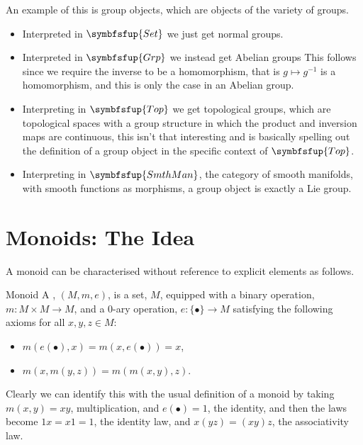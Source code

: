 \documentclass[fleqn]{NotesClass}
\makeatletter
\newcommand{\c@egory}[1]{\symbfsfup{#1}}
\newcommand{\Set}{\c@egory{Set}}
\newcommand{\Grp}{\c@egory{Grp}}
\newcommand{\Top}{\c@egory{Top}}
\makeatother
\begin{document}
    An example of this is group objects, which are objects of the variety of groups.
    \begin{itemize}
        \item Interpreted in \(\Set\) we just get normal groups.
        \item Interpreted in \(\Grp\) we instead get Abelian groups
        This follows since we require the inverse to be a homomorphism, that is \(g \mapsto g^{-1}\) is a homomorphism, and this is only the case in an Abelian group.
        \item Interpreting in \(\Top\) we get topological groups, which are topological spaces with a group structure in which the product and inversion maps are continuous, this isn't that interesting and is basically spelling out the definition of a group object in the specific context of \(\Top\).
        \item Interpreting in \(\makeatletter\c@egory{SmthMan}\makeatother\), the category of smooth manifolds, with smooth functions as morphisms, a group object is exactly a Lie group.
    \end{itemize}
    
    \section{Monoids: The Idea}
    A monoid can be characterised without reference to explicit elements as follows.
    \begin{dfn}{Monoid}{}
        A , \((M, m, e)\), is a set, \(M\), equipped with a binary operation, \(m \colon M \times M \to M\), and a 0-ary operation, \(e \colon \{\bullet\} \to M\) satisfying the following axioms for all \(x, y, z \in M\):
        \begin{itemize}
            \item \(m(e(\bullet), x) = m(x, e(\bullet)) = x\),
            \item \(m(x, m(y, z)) = m(m(x, y), z)\).
        \end{itemize}
    \end{dfn}
    
    Clearly we can identify this with the usual definition of a monoid by taking \(m(x, y) = xy\), multiplication, and \(e(\bullet) = 1\), the identity, and then the laws become \(1x = x1 = 1\), the identity law, and \(x(yz) = (xy)z\), the associativity law.
    
\end{document}
